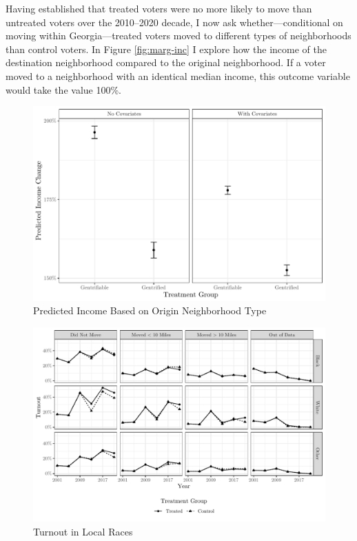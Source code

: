 \documentclass[
  12pt,
]{article}
\begin{document}
Having established that treated voters were no more likely to move than untreated voters over the 2010--2020 decade, I now ask whether---conditional on moving within Georgia---treated voters moved to different types of neighborhoods than control voters. In Figure \ref{fig:marg-inc} I explore how the income of the destination neighborhood compared to the original neighborhood. If a voter moved to a neighborhood with an identical median income, this outcome variable would take the value 100\%.

\begin{figure}[H]

{\centering \includegraphics{gentrification_files/figure-latex/move-inc-1} 

}

\caption{\label{fig:marg-inc}Predicted Income Based on Origin Neighborhood Type}\label{fig:move-inc}
\end{figure}

\begin{figure}[H]

{\centering \includegraphics{gentrification_files/figure-latex/to-1-1} 

}

\caption{\label{fig:local-turnout-plot}Turnout in Local Races}\label{fig:to-1}
\end{figure}
\end{document}
